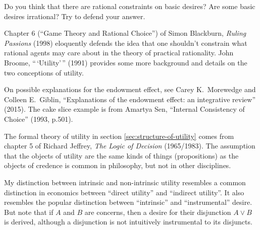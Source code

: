 \begin{essay}
  Do you think that there are rational constraints on basic desires? Are some
  basic desires irrational? Try to defend your answer.
\end{essay}

\begin{sources}

  Chapter 6 (``Game Theory and Rational Choice'') of Simon Blackburn,
  \emph{Ruling Passions} (1998) eloquently defends the idea that one shouldn't
  constrain what rational agents may care about in the theory of practical
  rationality. John Broome, ``\,`Utility'\,'' (1991) provides some more
  background and details on the two conceptions of utility.

  On possible explanations for the endowment effect, see Carey K.\ Morewedge and
  Colleen E.\ Giblin, ``Explanations of the endowment effect: an integrative
  review'' (2015). The cake slice example is from Amartya Sen, ``Internal
  Consistency of Choice'' (1993, p.501).

  The formal theory of utility in section \ref{sec:structure-of-utility} comes
  from chapter 5 of Richard Jeffrey, \emph{The Logic of Decision} (1965/1983).
  The assumption that the objects of utility are the same kinds of things
  (propositions) as the objects of credence is common in philosophy, but not in
  other disciplines.
  
  My distinction between intrinsic and non-intrinsic utility resembles a common
  distinction in economics between ``direct utility'' and ``indirect utility''.
  It also resembles the popular distinction between ``intrinsic'' and
  ``instrumental'' desire. But note that if $A$ and $B$ are concerns, then a
  desire for their disjunction $A \lor B$ is derived, although a disjunction is
  not intuitively instrumental to its disjuncts.

\end{sources}

  

